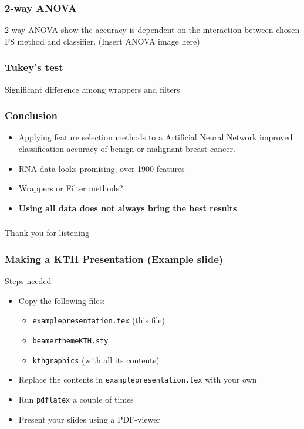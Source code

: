 \documentclass[aspectratio=1610]{beamer}
\begin{document}
\begin{frame}
  \frametitle{\hfill 2-way ANOVA}

  2-way ANOVA show the accuracy is dependent on the interaction between chosen FS method and classifier.
  (Insert ANOVA image here)
\end{frame}

\begin{frame}
  \frametitle{\hfill Tukey's test}
  Significant difference among wrappers and filters
\end{frame}

\begin{frame}
  \frametitle{\hfill Conclusion}
  \begin{itemize}
  \item Applying feature selection methods to a Artificial Neural Network improved classification accuracy of benign or malignant breast cancer. \\ \pause

  \item RNA data looks promising, over 1900 features \\ \pause

  \item Wrappers or Filter methods? \\ \pause

  \item \textbf{Using all data does not always bring the best results}

  \end{itemize}
\end{frame}

\begin{frame}
  \frametitle{\hfill }
  Thank you for listening
\end{frame}



\begin{frame}
  \frametitle{\hfill Making a KTH Presentation (Example slide)}

  \begin{block}{Steps needed}
    \begin{itemize}
    \item Copy the following files:
    \begin{itemize}
    \item \texttt{examplepresentation.tex} (this file)
    \item \texttt{beamerthemeKTH.sty}
    \item \texttt{kthgraphics} (with all its contents)
    \end{itemize}
    \item Replace the contents in \texttt{examplepresentation.tex} with your own
    \item Run \texttt{pdflatex} a couple of times
    \item Present your slides using a PDF-viewer
    \end{itemize}
  \end{block}

\end{frame}
\end{document}
